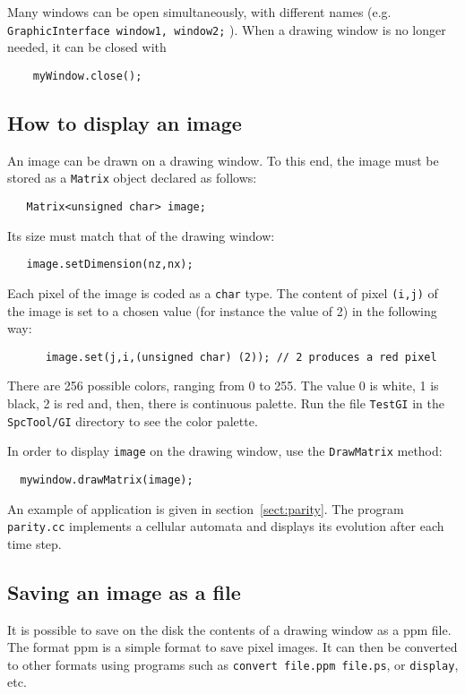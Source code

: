 \documentclass[12pt,a4paper]{article}
\begin{document}
Many windows can be open simultaneously, with different names (e.g. {\tt GraphicInterface window1, window2;} ). 
When a drawing window is no longer needed, it can be closed with
\begin{verbatim}
    myWindow.close();
\end{verbatim}

\subsection{How to display an image}

An image can be drawn on a drawing window. To this end, the image must
be stored as  a {\tt Matrix} object declared as follows:
\begin{verbatim}
   Matrix<unsigned char> image;
\end{verbatim}
Its size must match that of the drawing window:
\begin{verbatim}
   image.setDimension(nz,nx);
\end{verbatim}
Each pixel of the image is coded as a {\tt char} type. The content of
pixel {\tt (i,j)} of the image is set to a chosen value (for instance the value of 2) in the following way:
\begin{verbatim}
      image.set(j,i,(unsigned char) (2)); // 2 produces a red pixel
\end{verbatim}
There are 256 possible colors, ranging from 0 to 255. The value 0 is white, 1 is black,
2 is red and, then, there is continuous palette. Run the file {\tt TestGI} in the {\tt
SpcTool/GI} directory to see the color palette.

In order to display {\tt image} on the drawing window, use the {\tt DrawMatrix} method:
\begin{verbatim}
  mywindow.drawMatrix(image);
\end{verbatim}
An example of application is given in section~\ref{sect:parity}. The program {\tt parity.cc}
implements a cellular automata and displays its evolution after each time step.

\subsection{Saving an image as a file}
It is possible to save on the disk the contents of a drawing window as a ppm file.
The format ppm is a simple format to save pixel images. It can then be converted to
other formats using programs such as {\tt convert file.ppm file.ps}, or {\tt display}, etc.
\end{document}
